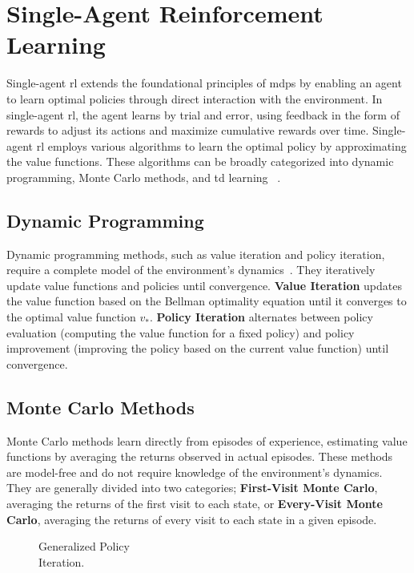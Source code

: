 \section{Single-Agent Reinforcement Learning}%

Single-agent \gls{rl} extends the foundational principles of \glspl{mdp} 
by enabling an agent to learn optimal policies through direct interaction with 
the environment. In single-agent \gls{rl}, the agent learns by trial and error, 
using feedback in the form of rewards to adjust its actions and maximize 
cumulative rewards over time.
Single-agent \gls{rl} employs various algorithms to learn the optimal policy by 
approximating the value functions. These algorithms can be broadly categorized 
into dynamic programming, Monte Carlo methods, and \gls{td} learning~%
\cite{sutton2018}.

    \subsection*{Dynamic Programming}%

Dynamic programming methods, such as value iteration and policy iteration, 
require a complete model of the environment's dynamics~\cite{sutton2018}.
They iteratively update value functions and policies until convergence. 
\textbf{Value Iteration} updates the value function based on the Bellman 
optimality equation until it converges to the optimal value function \(v_*\).
\textbf{Policy Iteration} alternates between policy evaluation 
(computing the value function for a fixed policy) and policy improvement 
(improving the policy based on the current value function) until convergence.

    \subsection*{Monte Carlo Methods}%

Monte Carlo methods learn directly from episodes of experience, 
estimating value functions by averaging the returns observed in actual episodes.
These methods are model-free and do not require knowledge of the environment's 
dynamics. They are generally divided into two categories; 
\textbf{First-Visit Monte Carlo}, averaging the returns of the first visit to 
each state, or \textbf{Every-Visit Monte Carlo}, averaging the returns of every
visit to each state in a given episode.

\begin{wrapfigure}[7]{r}{0.45\textwidth}
    \centering
    \vspace*{-1em}
    
    \caption{Generalized Policy\\Iteration.}
    \label{fig:gpi_cycle}
\end{wrapfigure}

